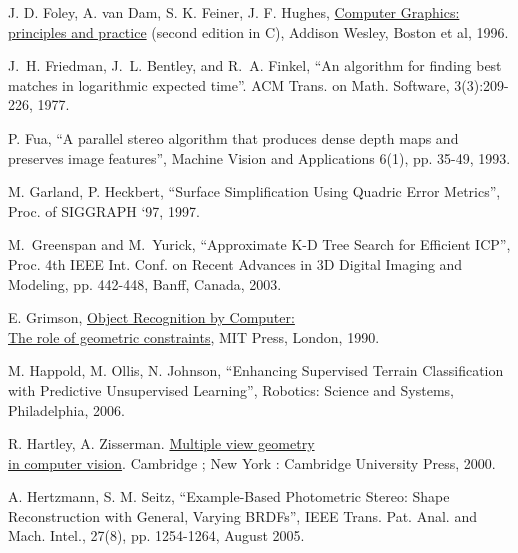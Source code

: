 \documentclass[twocolumn,oneside]{book}
\begin{document}
\begin{thebibliography}{99}
J. D. Foley, A. van Dam, S. K. Feiner, J. F. Hughes,
{\underline{Computer Graphics: principles and practice}} (second edition in C),
Addison Wesley, Boston et al, 1996.

J.~H. Friedman, J.~L. Bentley, and R.~A. Finkel,
``An algorithm for finding best matches in logarithmic expected time''.
ACM Trans. on Math. Software, 3(3):209-226, 1977.

P. Fua,
``A parallel stereo algorithm that produces dense depth maps and preserves image features'',
Machine Vision and Applications 6(1), pp. 35-49, 1993.

M. Garland, P. Heckbert,
``Surface Simplification Using Quadric Error Metrics'',
Proc. of SIGGRAPH ‘97, 1997.

M.~Greenspan and M.~Yurick,
``Approximate K-D Tree Search for Efficient ICP'',
Proc. 4th IEEE Int. Conf. on Recent Advances in 3D Digital Imaging and Modeling,
pp. 442-448, Banff, Canada, 2003.

E. Grimson,
{\underline {Object Recognition by Computer:}}\\{\underline {The role of geometric constraints}},
MIT Press, London, 1990.



M. Happold, M. Ollis, N. Johnson,
``Enhancing Supervised Terrain Classification with Predictive Unsupervised Learning'',
Robotics: Science and Systems, Philadelphia, 2006.

R. Hartley, A. Zisserman.
{\underline{Multiple view geometry}}\\{\underline{in computer vision}}.
Cambridge ; New York : Cambridge University Press, 2000.

A. Hertzmann, S. M. Seitz, 
``Example-Based Photometric Stereo: Shape Reconstruction with General, Varying BRDFs'',
IEEE Trans. Pat. Anal. and Mach. Intel., 27(8), pp. 1254-1264, August 2005.



\end{thebibliography}
\end{document}
